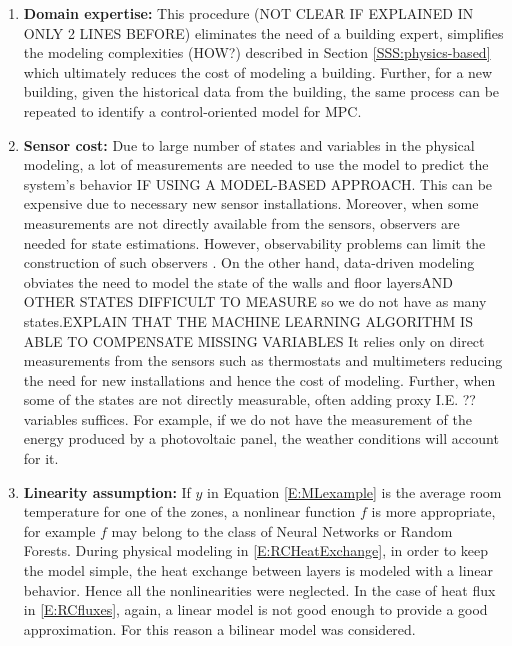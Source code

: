 \begin{enumerate}
	\item \textcolor[rgb]{0,0,1}{\textbf{Domain expertise:} 
	This procedure (\textcolor[rgb]{1,0,0}{NOT CLEAR IF EXPLAINED IN ONLY 2 LINES BEFORE}) eliminates the need of a building expert, simplifies the modeling complexities (\textcolor[rgb]{1,0,0}{HOW?}) described in Section \ref{SSS:physics-based} which ultimately reduces the cost of modeling a building. Further, for a new building, given the historical data from the building, the same process can be repeated to identify a control-oriented model for MPC.}
	\item \textcolor[rgb]{0,0,1}{\textbf{Sensor cost:}
	Due to large number of states and variables in the physical modeling, a lot of measurements are needed to use the model to predict the system's behavior \textcolor[rgb]{1,0,0}{IF USING A MODEL-BASED APPROACH}.
	This can be expensive due to necessary new sensor installations.
	Moreover, when some measurements are not directly available from the sensors, observers are needed for state estimations.
	However, observability problems can limit the construction of such observers \cite{Dorf2011MCS}. 
	On the other hand, data-driven modeling obviates the need to model the state of the walls and floor layers\textcolor[rgb]{1,0,0}{AND OTHER STATES DIFFICULT TO MEASURE} so we do not have as many states.\textcolor[rgb]{1,0,0}{EXPLAIN THAT THE MACHINE LEARNING ALGORITHM IS ABLE TO COMPENSATE MISSING VARIABLES}
	It relies only on direct measurements from the sensors such as thermostats and multimeters reducing the need for new installations and hence the cost of modeling.
	Further, when some of the states are not directly measurable, often adding proxy \textcolor[rgb]{1,0,0}{I.E. ??}variables suffices. 
	For example, if we do not have the measurement of the energy produced by a photovoltaic panel, the weather conditions will account for it.}
	\item \textcolor[rgb]{0,0,1}{\textbf{Linearity assumption:}
	If \(y\) in Equation \eqref{E:MLexample} is the average room temperature for one of the zones, a nonlinear function \(f\) is more appropriate, for example \(f\) may belong to the class of Neural Networks or Random Forests. 
	During physical modeling in \eqref{E:RCHeatExchange}, in order to keep the model simple, the heat exchange between layers is modeled with a linear behavior. 
	Hence all the nonlinearities were neglected.
	In the case of heat flux in \eqref{E:RCfluxes}, again, a linear model is not good enough to provide a good approximation. For this reason a bilinear model was considered.
}
\end{enumerate}
